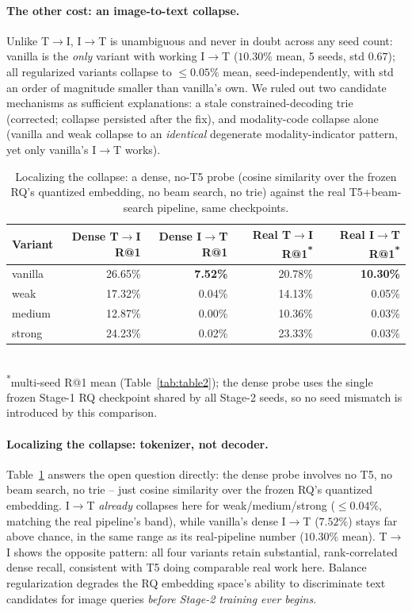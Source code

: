 \paragraph{The other cost: an image-to-text collapse.} Unlike T$\to$I, I$\to$T is unambiguous and never in doubt across any seed count: vanilla is the \emph{only} variant with working I$\to$T ($10.30\%$ mean, 5 seeds, std $0.67$); all regularized variants collapse to $\leq 0.05\%$ mean, seed-independently, with std an order of magnitude smaller than vanilla's own. We ruled out two candidate mechanisms as sufficient explanations: a stale constrained-decoding trie (corrected; collapse persisted after the fix), and modality-code collapse alone (vanilla and weak collapse to an \emph{identical} degenerate modality-indicator pattern, yet only vanilla's I$\to$T works).

\begin{table}[t]
\centering
\caption{Localizing the collapse: a dense, no-T5 probe (cosine similarity over the frozen RQ's quantized embedding, no beam search, no trie) against the real T5+beam-search pipeline, same checkpoints.}
\label{tab:localization}
\footnotesize
\begin{tabular}{@{}lrrrr@{}}
\toprule
Variant & Dense T$\to$I R@1 & Dense I$\to$T R@1 & Real T$\to$I R@1\textsuperscript{*} & Real I$\to$T R@1\textsuperscript{*} \\
\midrule
vanilla & 26.65\% & \textbf{7.52\%} & 20.78\% & \textbf{10.30\%} \\
weak    & 17.32\% & 0.04\% & 14.13\% & 0.05\% \\
medium  & 12.87\% & 0.00\% & 10.36\% & 0.03\% \\
strong  & 24.23\% & 0.02\% & 23.33\% & 0.03\% \\
\bottomrule
\end{tabular}
\\[2pt]
\footnotesize\textsuperscript{*}multi-seed R@1 mean (Table~\ref{tab:table2}); the dense probe uses the single frozen Stage-1 RQ checkpoint shared by all Stage-2 seeds, so no seed mismatch is introduced by this comparison.
\end{table}

\paragraph{Localizing the collapse: tokenizer, not decoder.} Table~\ref{tab:localization} answers the open question directly: the dense probe involves no T5, no beam search, no trie -- just cosine similarity over the frozen RQ's quantized embedding. I$\to$T \emph{already} collapses here for weak/medium/strong ($\leq 0.04\%$, matching the real pipeline's band), while vanilla's dense I$\to$T ($7.52\%$) stays far above chance, in the same range as its real-pipeline number ($10.30\%$ mean). T$\to$I shows the opposite pattern: all four variants retain substantial, rank-correlated dense recall, consistent with T5 doing comparable real work here. Balance regularization degrades the RQ embedding space's ability to discriminate text candidates for image queries \emph{before Stage-2 training ever begins}.

